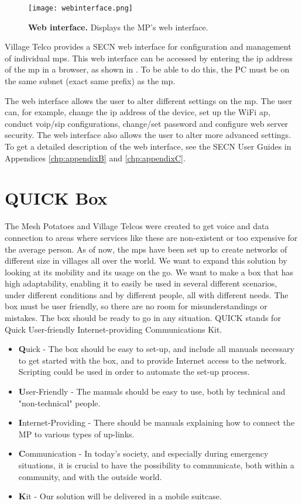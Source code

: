 \begin{figure}[t]
  \centering
      \texttt{[image: webinterface.png]}
  \caption [Web interface]{\textbf{Web interface.} Displays the MP's web interface.}
  \label{fig:webinterface}
\end{figure}

Village Telco provides a SECN web interface for configuration and management of individual \glspl{mp}. This web interface can be accessed by entering the \gls{ip} address of the \gls{mp} in a browser, as shown in . To be able to do this, the PC must be on the same subnet (exact same prefix) as the \gls{mp}.    

The web interface allows the user to alter different settings on the \gls{mp}. The user can, for example, change the \gls{ip} address of the device, set up the WiFi \gls{ap}, conduct \gls{voip}/\gls{sip} configurations, change/set password and configure web server security. The web interface also allows the user to alter more advanced settings. To get a detailed description of the web interface, see the SECN User Guides in Appendices \ref{chp:appendixB} and \ref{chp:appendixC}.



\section{QUICK Box}
The Mesh Potatoes and Village Telcos were created to get voice and data connection to areas where services like these are non-existent or too expensive for the average person. As of now, the \glspl{mp} have been set up to create networks of different size in villages all over the world. We want to expand this solution by looking at its mobility and its usage on the go. We want to make a box that has high adaptability, enabling it to easily be used in several different scenarios, under different conditions and by different people, all with different needs. The box must be user friendly, so there are no room for misunderstandings or mistakes. The box should be ready to go in any situation. QUICK stands for Quick User-friendly Internet-providing Communications Kit. 

\begin{itemize}
\item [] \textbf{Q}uick - The box should be easy to set-up, and include all manuals necessary to get started with the box, and to provide Internet access to the network. Scripting could be used in order to automate the set-up process. 
\item [] \textbf{U}ser-Friendly - The manuals should be easy to use, both by technical and "non-technical" people. 
\item [] \textbf{I}nternet-Providing - There should be manuals explaining how to connect the MP to various types of up-links. 
\item [] \textbf{C}ommunication - In today's society, and especially during emergency situations, it is crucial to have the possibility to communicate, both within a community, and with the outside world.
\item [] \textbf{K}it - Our solution will be delivered in a mobile suitcase. 
\end{itemize}

